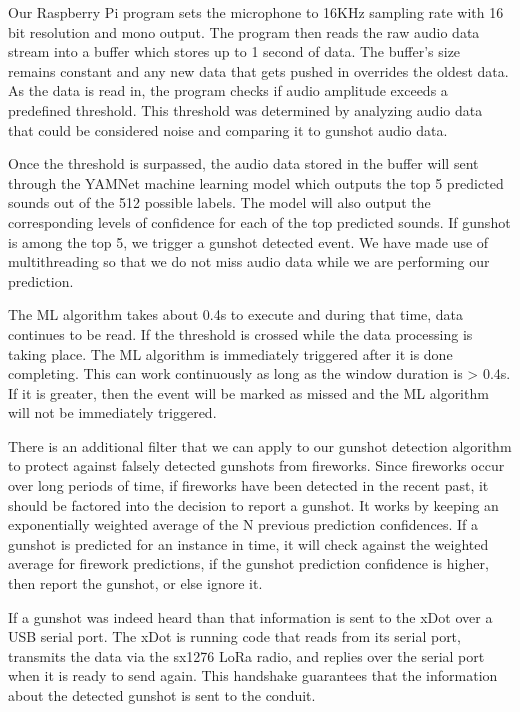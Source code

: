 \documentclass[conference]{IEEEtran}
\begin{document}
Our Raspberry Pi program sets the microphone to 16KHz sampling rate with 16 bit resolution and mono output. The program then reads the raw audio data stream into a buffer which stores up to 1 second of data. The buffer’s size remains constant and any new data that gets pushed in overrides the oldest data. As the data is read in, the program checks if audio amplitude exceeds a predefined threshold. This threshold was determined by analyzing audio data that could be considered noise and comparing it to gunshot audio data. 

Once the threshold is surpassed, the audio data stored in the buffer will sent through the YAMNet machine learning model which outputs the top 5 predicted sounds out of the 512 possible labels. The model will also output the corresponding levels of confidence for each of the top predicted sounds. If gunshot is among the top 5, we trigger a gunshot detected event.  We have made use of multithreading so that we do not miss audio data while we are performing our prediction. 

The ML algorithm takes about 0.4s to execute and during that time, data continues to be read. If the threshold is crossed while the data processing is taking place. The ML algorithm is immediately triggered after it is done completing. This can work continuously as long as the window duration is > 0.4s. If it is greater, then the event will be marked as missed and the ML algorithm will not be immediately triggered.

There is an additional filter that we can apply to our gunshot detection algorithm to protect against falsely detected gunshots from fireworks. Since fireworks occur over long periods of time, if fireworks have been detected in the recent past, it should be factored into the decision to report a gunshot. It works by keeping an exponentially weighted average of the N previous prediction confidences. If a gunshot is predicted for an instance in time, it will check against the weighted average for firework predictions, if the gunshot prediction confidence is higher, then report the gunshot, or else ignore it.

If a gunshot was indeed heard than that information is sent to the xDot over a USB serial port. The xDot is running code that reads from its serial port, transmits the data via the sx1276 LoRa radio, and replies over the serial port when it is ready to send again. This handshake guarantees that the information about the detected gunshot is sent to the conduit.
\end{document}
